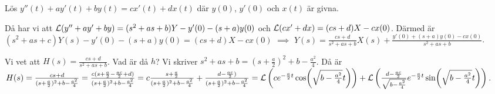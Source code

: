 \documentclass[a4paper]{article}
\begin{document}
\begin{ex}
    Lös \(
        y''(t) + ay'(t) + by(t) = cx'(t) + dx(t)
    \) där \(
        y(0)
    \), \(
        y'(0)
    \) och \(
        x(t)
    \) är givna.

    Då har vi att \(
        \operatorname{\mathcal{L}}(y''+ay'+by) = (s^2 + as + b) Y - y'(0) - (s+a)y(0)
    \) och \(
        \operatorname{\mathcal{L}}(cx'+dx) = (cs+d)X - cx(0)
    \). Därmed är \(
        (s^2+as+c) Y(s) - y'(0) - (s+a)y(0) = (cs+d)X - cx(0)
    \) \(
        \implies 
    \) \(
        Y(s) = \frac{cs+d}{s^2+as+b} X(s) + \frac{y'(0)+(s+a)y(0)-cx(0)}{s^2+as+b} 
    \).

    Vi vet att \(
        H(s) = \frac{cs+d}{s^2+as+b} 
    \). Vad är då \(
        h
    \)? Vi skriver \(
        s^2+as+b = (s+\frac{a}{2} )^2 + b - \frac{a^2}{4} 
    \). Då är \(
        H(s) = \frac{cs+d}{(s+\frac{a}{2} )^2 + b - \frac{a^2}{4}}
             = \frac{c(s+\frac{a}{2} -\frac{ac}{2} + d)}{(s+\frac{a}{2} )^2 + b - \frac{a^2}{4}}
             = c \frac{s+\frac{a}{2}}{(s+\frac{a}{2} )^2 + b - \frac{a^2}{4}} + \frac{d-\frac{ac}{2})}{(s+\frac{a}{2} )^2 + b - \frac{a^2}{4}}
             = \operatorname{\mathcal{L}}\left(c e^{-\frac{a}{2} t} \cos(\sqrt{b - \frac{a^2}{4} } t)\right) + \operatorname{\mathcal{L}}\left( \frac{d-\frac{ac}{2} }{\sqrt{b-\frac{a^2}{4} }} e^{-\frac{a}{2} t} \sin( \sqrt{b - \frac{a^2}{4} } t) \right)
    \).
\end{ex}
\end{document}
